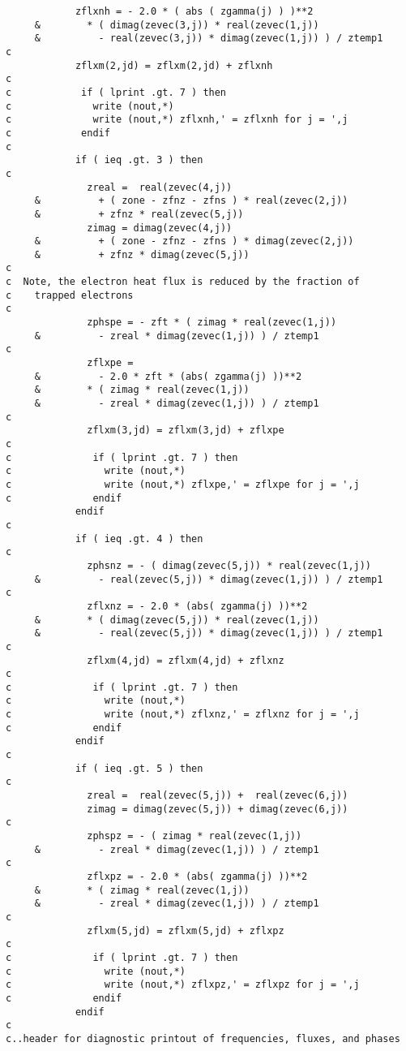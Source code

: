 \begin{verbatim}
            zflxnh = - 2.0 * ( abs ( zgamma(j) ) )**2
     &        * ( dimag(zevec(3,j)) * real(zevec(1,j))
     &          - real(zevec(3,j)) * dimag(zevec(1,j)) ) / ztemp1
c
            zflxm(2,jd) = zflxm(2,jd) + zflxnh
c
c            if ( lprint .gt. 7 ) then
c              write (nout,*)
c              write (nout,*) zflxnh,' = zflxnh for j = ',j
c            endif
c
            if ( ieq .gt. 3 ) then
c
              zreal =  real(zevec(4,j))
     &          + ( zone - zfnz - zfns ) * real(zevec(2,j))
     &          + zfnz * real(zevec(5,j))
              zimag = dimag(zevec(4,j))
     &          + ( zone - zfnz - zfns ) * dimag(zevec(2,j))
     &          + zfnz * dimag(zevec(5,j))
c
c  Note, the electron heat flux is reduced by the fraction of
c    trapped electrons
c
              zphspe = - zft * ( zimag * real(zevec(1,j))
     &          - zreal * dimag(zevec(1,j)) ) / ztemp1
c
              zflxpe =
     &          - 2.0 * zft * (abs( zgamma(j) ))**2
     &        * ( zimag * real(zevec(1,j))
     &          - zreal * dimag(zevec(1,j)) ) / ztemp1
c
              zflxm(3,jd) = zflxm(3,jd) + zflxpe
c
c              if ( lprint .gt. 7 ) then
c                write (nout,*)
c                write (nout,*) zflxpe,' = zflxpe for j = ',j
c              endif
            endif
c
            if ( ieq .gt. 4 ) then
c
              zphsnz = - ( dimag(zevec(5,j)) * real(zevec(1,j))
     &          - real(zevec(5,j)) * dimag(zevec(1,j)) ) / ztemp1
c
              zflxnz = - 2.0 * (abs( zgamma(j) ))**2
     &        * ( dimag(zevec(5,j)) * real(zevec(1,j))
     &          - real(zevec(5,j)) * dimag(zevec(1,j)) ) / ztemp1
c
              zflxm(4,jd) = zflxm(4,jd) + zflxnz
c
c              if ( lprint .gt. 7 ) then
c                write (nout,*)
c                write (nout,*) zflxnz,' = zflxnz for j = ',j
c              endif
            endif
c
            if ( ieq .gt. 5 ) then
c
              zreal =  real(zevec(5,j)) +  real(zevec(6,j))
              zimag = dimag(zevec(5,j)) + dimag(zevec(6,j))
c
              zphspz = - ( zimag * real(zevec(1,j))
     &          - zreal * dimag(zevec(1,j)) ) / ztemp1
c
              zflxpz = - 2.0 * (abs( zgamma(j) ))**2
     &        * ( zimag * real(zevec(1,j))
     &          - zreal * dimag(zevec(1,j)) ) / ztemp1
c
              zflxm(5,jd) = zflxm(5,jd) + zflxpz
c
c              if ( lprint .gt. 7 ) then
c                write (nout,*)
c                write (nout,*) zflxpz,' = zflxpz for j = ',j
c              endif
            endif
c                       
c..header for diagnostic printout of frequencies, fluxes, and phases

\end{verbatim}

